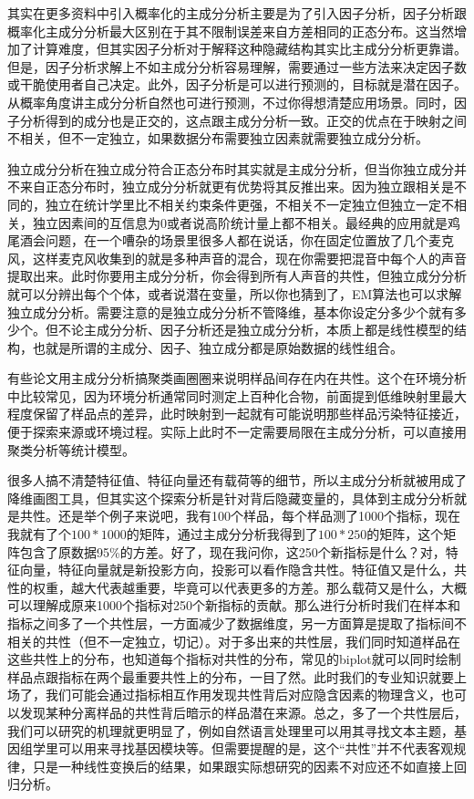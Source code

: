 \documentclass[]{tufte-book}
\begin{document}
其实在更多资料中引入概率化的主成分分析主要是为了引入因子分析，因子分析跟概率化主成分分析最大区别在于其不限制误差来自方差相同的正态分布。这当然增加了计算难度，但其实因子分析对于解释这种隐藏结构其实比主成分分析更靠谱。但是，因子分析求解上不如主成分分析容易理解，需要通过一些方法来决定因子数或干脆使用者自己决定。此外，因子分析是可以进行预测的，目标就是潜在因子。从概率角度讲主成分分析自然也可进行预测，不过你得想清楚应用场景。同时，因子分析得到的成分也是正交的，这点跟主成分分析一致。正交的优点在于映射之间不相关，但不一定独立，如果数据分布需要独立因素就需要独立成分分析。

独立成分分析在独立成分符合正态分布时其实就是主成分分析，但当你独立成分并不来自正态分布时，独立成分分析就更有优势将其反推出来。因为独立跟相关是不同的，独立在统计学里比不相关约束条件更强，不相关不一定独立但独立一定不相关，独立因素间的互信息为0或者说高阶统计量上都不相关。最经典的应用就是鸡尾酒会问题，在一个嘈杂的场景里很多人都在说话，你在固定位置放了几个麦克风，这样麦克风收集到的就是多种声音的混合，现在你需要把混音中每个人的声音提取出来。此时你要用主成分分析，你会得到所有人声音的共性，但独立成分分析就可以分辨出每个个体，或者说潜在变量，所以你也猜到了，EM算法也可以求解独立成分分析。需要注意的是独立成分分析不管降维，基本你设定分多少个就有多少个。但不论主成分分析、因子分析还是独立成分分析，本质上都是线性模型的结构，也就是所谓的主成分、因子、独立成分都是原始数据的线性组合。

有些论文用主成分分析搞聚类画圈圈来说明样品间存在内在共性。这个在环境分析中比较常见，因为环境分析通常同时测定上百种化合物，前面提到低维映射里最大程度保留了样品点的差异，此时映射到一起就有可能说明那些样品污染特征接近，便于探索来源或环境过程。实际上此时不一定需要局限在主成分分析，可以直接用聚类分析等统计模型。

很多人搞不清楚特征值、特征向量还有载荷等的细节，所以主成分分析就被用成了降维画图工具，但其实这个探索分析是针对背后隐藏变量的，具体到主成分分析就是共性。还是举个例子来说吧，我有100个样品，每个样品测了1000个指标，现在我就有了个\(100*1000\)的矩阵，通过主成分分析我得到了\(100*250\)的矩阵，这个矩阵包含了原数据95\%的方差。好了，现在我问你，这250个新指标是什么？对，特征向量，特征向量就是新投影方向，投影可以看作隐含共性。特征值又是什么，共性的权重，越大代表越重要，毕竟可以代表更多的方差。那么载荷又是什么，大概可以理解成原来1000个指标对250个新指标的贡献。那么进行分析时我们在样本和指标之间多了一个共性层，一方面减少了数据维度，另一方面算是提取了指标间不相关的共性（但不一定独立，切记）。对于多出来的共性层，我们同时知道样品在这些共性上的分布，也知道每个指标对共性的分布，常见的biplot就可以同时绘制样品点跟指标在两个最重要共性上的分布，一目了然。此时我们的专业知识就要上场了，我们可能会通过指标相互作用发现共性背后对应隐含因素的物理含义，也可以发现某种分离样品的共性背后暗示的样品潜在来源。总之，多了一个共性层后，我们可以研究的机理就更明显了，例如自然语言处理里可以用其寻找文本主题，基因组学里可以用来寻找基因模块等。但需要提醒的是，这个``共性''并不代表客观规律，只是一种线性变换后的结果，如果跟实际想研究的因素不对应还不如直接上回归分析。
\end{document}
